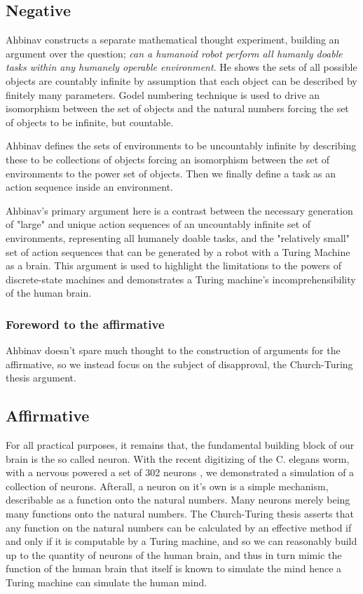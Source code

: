 \documentclass{article}
\begin{document}
\subsection*{Negative}
Ahbinav constructs a separate mathematical thought experiment, building an argument over the question; \emph{can a humanoid robot perform all humanly doable tasks within any humanely operable environment}. He shows the sets of all possible objects are countably infinite by assumption that each object can be described by finitely many parameters. Godel numbering technique is used to drive an isomorphism between the set of objects and the natural numbers forcing the set of objects to be infinite, but countable.

Ahbinav defines the sets of environments to be uncountably infinite by describing these to be collections of objects forcing an isomorphism between the set of environments to the power set of objects. Then we finally define a task as an action sequence inside an environment. 

Ahbinav's primary argument here is a contrast between the necessary generation of "large" and unique action sequences of an uncountably infinite set of environments, representing all humanely doable tasks, and the "relatively small" set of action sequences that can be generated by a robot with a Turing Machine as a brain. This argument is used to highlight the limitations to the powers of discrete-state machines and demonstrates a Turing machine's incomprehensibility of the human brain.

\subsubsection*{Foreword to the affirmative}
Ahbinav doesn't spare much thought to the construction of arguments for the affirmative, so we instead focus on the subject of disapproval, the Church-Turing thesis argument.

\subsection*{Affirmative}
For all practical purposes, it remains that, the fundamental building block of our brain is the so called neuron. With the recent digitizing of the C. elegans worm, with a nervous powered a set of 302 neurons \cite{worm}, we demonstrated a simulation of a collection of neurons. Afterall, a neuron on it's own is a simple mechanism, describable as a function onto the natural numbers. Many neurons merely being many functions onto the natural numbers. The Church-Turing thesis asserts that any function on the natural numbers can be calculated by an effective method if and only if it is computable by a Turing machine\cite{church-turing}, and so we can reasonably build up to the quantity of neurons of the human brain, and thus in turn mimic the function of the human brain that itself is known to simulate the mind hence a Turing machine can simulate the human mind.
\end{document}
